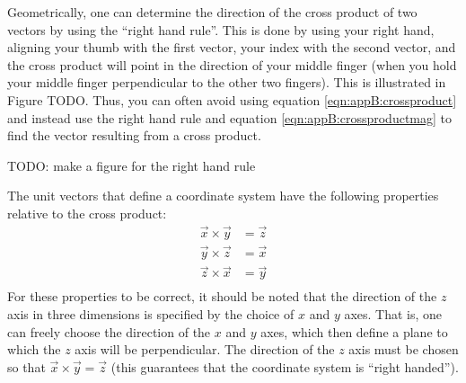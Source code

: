 Geometrically, one can determine the direction of the cross product of two vectors by using the ``right hand rule''. This is done by using your right hand, aligning your thumb with the first vector, your index with the second vector, and the cross product will point in the direction of your middle finger (when you hold your middle finger perpendicular to the other two fingers). This is illustrated in Figure TODO. Thus, you can often avoid using equation \ref{eqn:appB:crossproduct} and instead use the right hand rule and equation \ref{eqn:appB:crossproductmag} to find the vector resulting from a cross product.

TODO: make a figure for the right hand rule

The unit vectors that define a coordinate system have the following properties relative to the cross product:
\begin{align*}
\vec x \times \vec y &= \vec z\\
\vec y \times \vec z &= \vec x\\
\vec z \times \vec x &= \vec y\\
\end{align*}
For these properties to be correct, it should be noted that the direction of the $z$ axis in three dimensions is specified by the choice of $x$ and $y$ axes. That is, one can freely choose the direction of the $x$ and $y$ axes, which then define a plane to which the $z$ axis will be perpendicular. The direction of the $z$ axis must be chosen so that $\vec x \times \vec y = \vec z$ (this guarantees that the coordinate system is ``right handed''). 



